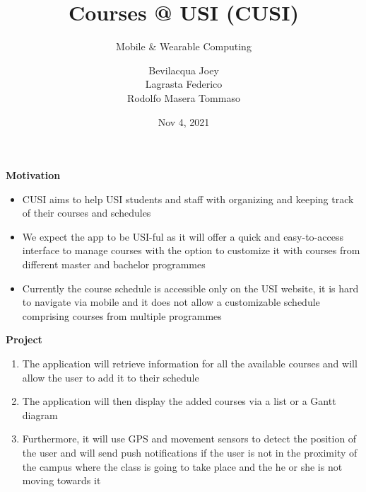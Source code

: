 \documentclass[t,aspectratio=1610]{beamer}
\title{Courses @ USI (CUSI)}
\subtitle{Mobile \& Wearable Computing}
\author{Bevilacqua Joey \\ Lagrasta Federico \\ Rodolfo Masera Tommaso}
\institute{Universit\`a della Svizzera Italiana\\ Faculty of Informatics\\ \href{http://www.unisi.ch}{www.unisi.ch}}
\date{Nov 4, 2021}
\begin{document}
{

\begin{frame}
\maketitle
\end{frame}
}

{

\begin{frame}
\textbf{Motivation} \\

\begin{itemize}
\item CUSI aims to help USI students and staff with organizing and keeping track of their courses and schedules
\pause
\item We expect the app to be USI-ful as it will offer a quick and easy-to-access interface to manage courses with the option to customize it with courses from different master and bachelor programmes
\pause
\item Currently the course schedule is accessible only on the USI website, it is hard to navigate via mobile and it does not allow a customizable schedule comprising courses from multiple programmes
\end{itemize}
\end{frame}
}

{
\begin{frame}
\textbf{Project} \\

\begin{enumerate}
\item The application will retrieve information for all the available courses and will allow the user to add it to their schedule
\pause
\item The application will then display the added courses via a list or a Gantt diagram
\pause
\item Furthermore, it will use GPS and movement sensors to detect the position of the user and will send push notifications if the user is not in the proximity of the campus where the class is going to take place and the he or she is not moving towards it 
\end{enumerate}
\end{frame}
}
\end{document}
